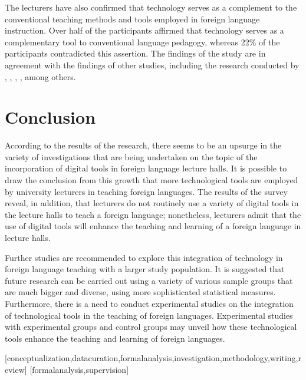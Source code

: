 \documentclass[english]{textolivre}
\begin{document}
The lecturers have also confirmed that technology serves as a complement to the conventional teaching methods and tools employed in foreign language instruction. Over half of the participants affirmed that technology serves as a complementary tool to conventional language pedagogy, whereas 22\% of the participants contradicted this assertion. The findings of the study are in agreement with the findings of other studies, including the research conducted by \textcite{abdulrahaman_multimedia_2020}, \textcite{ahmadi_use_2018}, \textcite{hartono_language:_2021}, \textcite{lyublinskaya_analysis_2022}, among others.



\section{Conclusion}

According to the results of the research, there seems to be an upsurge in the variety of investigations that are being undertaken on the topic of the incorporation of digital tools in foreign language lecture halls.  It is possible to draw the conclusion from this growth that more technological tools are employed by university lecturers in teaching foreign languages. The results of the survey reveal, in addition, that lecturers do not routinely use a variety of digital tools in the lecture halls to teach a foreign language; nonetheless, lecturers admit that the use of digital tools will enhance the teaching and learning of a foreign language in lecture halls. 

Further studies are recommended to explore this integration of technology in foreign language teaching with a larger study population. It is suggested that future research can be carried out using a variety of various sample groups that are much bigger and diverse, using more sophisticated statistical measures. Furthermore, there is a need to conduct experimental studies on the integration of technological tools in the teaching of foreign languages. Experimental studies with experimental groups and control groups may unveil how these technological tools enhance the teaching and learning of foreign languages.


\printbibliography\label{sec-bib}


\begin{contributors}
[conceptualization,datacuration,formalanalysis,investigation,methodology,writing,review]
[formalanalysis,supervision]
\end{contributors}
\end{document}
